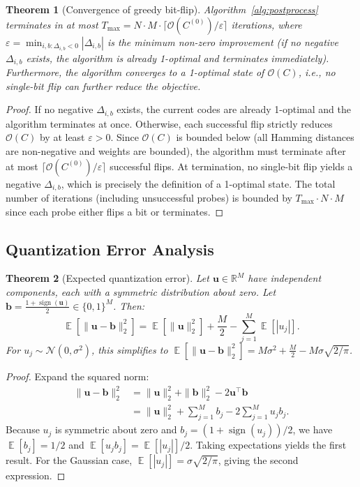 \documentclass[11pt,a4paper]{article}
\newtheorem{theorem}{Theorem}
\DeclareMathOperator{\sign}{sign}
\DeclareMathOperator{\E}{\mathbb{E}}
\begin{document}
\begin{theorem}[Convergence of greedy bit-flip]\label{thm:convergence}
Algorithm~\ref{alg:postprocess} terminates in at most $T_{\max} = N \cdot M \cdot \lceil \mathcal{O}(C^{(0)}) / \varepsilon \rceil$ iterations, where $\varepsilon = \min_{i,b: \Delta_{i,b} < 0} |\Delta_{i,b}|$ is the minimum non-zero improvement (if no negative $\Delta_{i,b}$ exists, the algorithm is already 1-optimal and terminates immediately). Furthermore, the algorithm converges to a 1-optimal state of $\mathcal{O}(C)$, i.e., no single-bit flip can further reduce the objective.
\end{theorem}

\begin{proof}
If no negative $\Delta_{i,b}$ exists, the current codes are already 1-optimal and the algorithm terminates at once. Otherwise, each successful flip strictly reduces $\mathcal{O}(C)$ by at least $\varepsilon > 0$. Since $\mathcal{O}(C)$ is bounded below (all Hamming distances are non-negative and weights are bounded), the algorithm must terminate after at most $\lceil \mathcal{O}(C^{(0)}) / \varepsilon \rceil$ successful flips. At termination, no single-bit flip yields a negative $\Delta_{i,b}$, which is precisely the definition of a 1-optimal state. The total number of iterations (including unsuccessful probes) is bounded by $T_{\max} \cdot N \cdot M$ since each probe either flips a bit or terminates.
\end{proof}

\subsection{Quantization Error Analysis}

\begin{theorem}[Expected quantization error]\label{thm:quant-error}
Let $\mathbf{u} \in \mathbb{R}^M$ have independent components, each with a symmetric distribution about zero. Let $\mathbf{b} = \frac{1 + \sign(\mathbf{u})}{2} \in \{0,1\}^M$. Then:
\begin{equation}
    \E[\|\mathbf{u} - \mathbf{b}\|_2^2] = \E[\|\mathbf{u}\|_2^2] + \frac{M}{2} - \sum_{j=1}^{M} \E[|u_j|].
\end{equation}
For $u_j \sim \mathcal{N}(0, \sigma^2)$, this simplifies to $\E[\|\mathbf{u} - \mathbf{b}\|_2^2] = M\sigma^2 + \frac{M}{2} - M\sigma\sqrt{2/\pi}$.
\end{theorem}

\begin{proof}
Expand the squared norm:
\begin{align}
    \|\mathbf{u} - \mathbf{b}\|_2^2 &= \|\mathbf{u}\|_2^2 + \|\mathbf{b}\|_2^2 - 2\mathbf{u}^\top \mathbf{b} \\
    &= \|\mathbf{u}\|_2^2 + \sum_{j=1}^{M} b_j - 2\sum_{j=1}^{M} u_j b_j.
\end{align}
Because $u_j$ is symmetric about zero and $b_j = (1 + \sign(u_j))/2$, we have $\E[b_j] = 1/2$ and $\E[u_j b_j] = \E[|u_j|]/2$. Taking expectations yields the first result. For the Gaussian case, $\E[|u_j|] = \sigma\sqrt{2/\pi}$, giving the second expression.
\end{proof}
\end{document}
